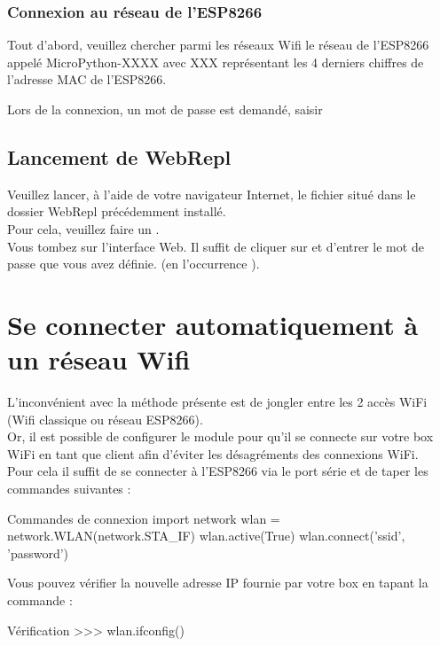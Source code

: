 {\subsubsection{Connexion au réseau de l'ESP8266}

Tout d'abord, veuillez chercher parmi les réseaux Wifi le réseau de l'ESP8266 appelé MicroPython-XXXX avec XXX représentant les 4 derniers chiffres de l'adresse MAC de l'ESP8266.

Lors de la connexion, un mot de passe est demandé, saisir 

\subsection{Lancement de WebRepl}

 Veuillez lancer, à l'aide de votre navigateur Internet, le fichier   situé dans le dossier WebRepl précédemment installé. \\
 Pour cela, veuillez faire un . \\
Vous tombez sur l’interface Web. Il suffit de cliquer sur  et d’entrer le mot de passe que vous avez définie.
(en l'occurrence ).


\section{Se connecter automatiquement à un réseau Wifi}

L’inconvénient avec la méthode présente est de jongler entre les 2 accès WiFi (Wifi classique ou réseau ESP8266).\\
Or, il est possible de configurer le module pour qu’il se connecte sur votre box WiFi en tant que client afin d'éviter les désagréments des connexions WiFi. \\
Pour cela il suffit de se connecter à l'ESP8266 via le port série et de taper les commandes suivantes : 
\begin{Bash}{Commandes de connexion}
import network
wlan = network.WLAN(network.STA_IF)
wlan.active(True)
wlan.connect('ssid', 'password')
\end{Bash}

Vous pouvez vérifier la nouvelle adresse IP fournie par votre box en tapant la commande :
\begin{Bash}{Vérification}
>>> wlan.ifconfig()
\end{Bash}

}

